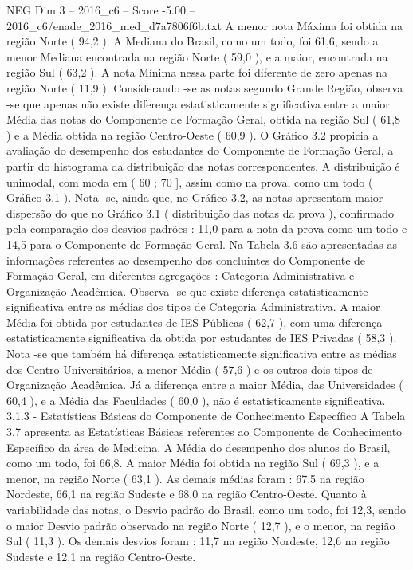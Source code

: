 \begin{textsample}{NEG Dim 3 – 2016\_c6 – Score -5.00 – 2016\_c6/enade\_2016\_med\_d7a7806f6b.txt}
A menor nota Máxima foi obtida na região Norte ( 94,2 ).
A Mediana do Brasil, como um todo, foi 61,6, sendo a menor Mediana encontrada na região Norte ( 59,0 ), e a maior, encontrada na região Sul ( 63,2 ).
A nota Mínima nessa parte foi diferente de zero apenas na região Norte ( 11,9 ).
Considerando -se as notas segundo Grande Região, observa -se que apenas não existe diferença estatisticamente significativa entre a maior Média das notas do Componente de Formação Geral, obtida na região Sul ( 61,8 ) e a Média obtida na região Centro-Oeste ( 60,9 ).
O Gráfico 3.2 propicia a avaliação do desempenho dos estudantes do Componente de Formação Geral, a partir do histograma da distribuição das notas correspondentes.
A distribuição é unimodal, com moda em ( 60 ; 70 ], assim como na prova, como um todo ( Gráfico 3.1 ).
Nota -se, ainda que, no Gráfico 3.2, as notas apresentam maior dispersão do que no Gráfico 3.1 ( distribuição das notas da prova ), confirmado pela comparação dos desvios padrões : 11,0 para a nota da prova como um todo e 14,5 para o Componente de Formação Geral.
Na Tabela 3.6 são apresentadas as informações referentes ao desempenho dos concluintes do Componente de Formação Geral, em diferentes agregações : Categoria Administrativa e Organização Acadêmica.
Observa -se que existe diferença estatisticamente significativa entre as médias dos tipos de Categoria Administrativa.
A maior Média foi obtida por estudantes de IES Públicas ( 62,7 ), com uma diferença estatisticamente significativa da obtida por estudantes de IES Privadas ( 58,3 ).
Nota -se que também há diferença estatisticamente significativa entre as médias dos Centro Universitários, a menor Média ( 57,6 ) e os outros dois tipos de Organização Acadêmica.
Já a diferença entre a maior Média, das Universidades ( 60,4 ), e a Média das Faculdades ( 60,0 ), não é estatisticamente significativa. 3.1.3 - Estatísticas Básicas do Componente de Conhecimento Específico A Tabela 3.7 apresenta as Estatísticas Básicas referentes ao Componente de Conhecimento Específico da área de Medicina.
A Média do desempenho dos alunos do Brasil, como um todo, foi 66,8.
A maior Média foi obtida na região Sul ( 69,3 ), e a menor, na região Norte ( 63,1 ).
As demais médias foram : 67,5 na região Nordeste, 66,1 na região Sudeste e 68,0 na região Centro-Oeste.
Quanto à variabilidade das notas, o Desvio padrão do Brasil, como um todo, foi 12,3, sendo o maior Desvio padrão observado na região Norte ( 12,7 ), e o menor, na região Sul ( 11,3 ).
Os demais desvios foram : 11,7 na região Nordeste, 12,6 na região Sudeste e 12,1 na região Centro-Oeste.

\end{textsample}
